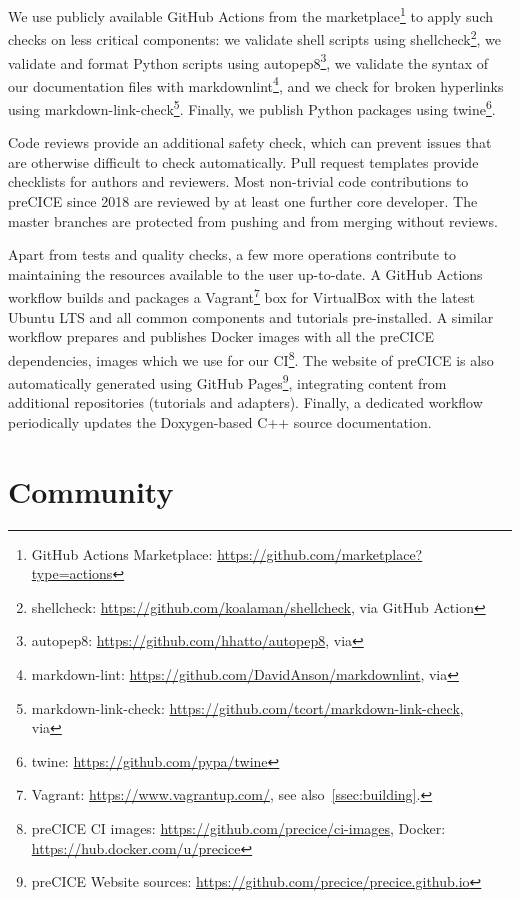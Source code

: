 We use publicly available GitHub Actions from the marketplace\footnote{GitHub Actions Marketplace: \url{https://github.com/marketplace?type=actions}} to apply such checks on less critical components:
we validate shell scripts using shellcheck\footnote{shellcheck: \url{https://github.com/koalaman/shellcheck}, via GitHub Action },
we validate and format Python scripts using autopep8\footnote{autopep8: \url{https://github.com/hhatto/autopep8}, via },
we validate the syntax of our documentation files with markdownlint\footnote{markdown-lint: \url{https://github.com/DavidAnson/markdownlint}, via },
and we check for broken hyperlinks using markdown-link-check\footnote{markdown-link-check: \url{https://github.com/tcort/markdown-link-check},\\ via }.
Finally, we publish Python packages using twine\footnote{twine: \url{https://github.com/pypa/twine}}.

Code reviews provide an additional safety check, which can prevent issues that are otherwise difficult to check automatically. Pull request templates provide checklists for authors and reviewers. Most non-trivial code contributions to preCICE since 2018 are reviewed by at least one further core developer. The master branches are protected from pushing and from merging without reviews.

Apart from tests and quality checks, a few more operations contribute to maintaining the resources available to the user up-to-date. A GitHub Actions workflow builds and packages a Vagrant\footnote{Vagrant: \url{https://www.vagrantup.com/}, see also~\autoref{ssec:building}.} box for VirtualBox with the latest Ubuntu LTS and all common components and tutorials pre-installed. A similar workflow prepares and publishes Docker images with all the preCICE dependencies, images which we use for our CI\footnote{preCICE CI images: \url{https://github.com/precice/ci-images}, Docker: \url{https://hub.docker.com/u/precice}}. The website of preCICE is also automatically generated using GitHub Pages\footnote{preCICE Website sources: \url{https://github.com/precice/precice.github.io}}, integrating content from additional repositories (tutorials and adapters). Finally, a dedicated workflow periodically updates the Doxygen-based C++ source documentation.
 \section{Community} 
\label{sec:community}

